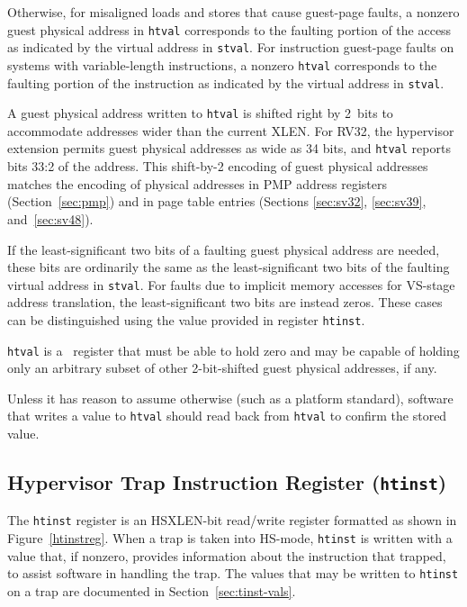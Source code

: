 Otherwise, for misaligned loads and stores that cause guest-page faults,
a nonzero guest physical address in {\tt htval} corresponds to the
faulting portion of the access as indicated by the virtual address in
{\tt stval}.
For instruction guest-page faults on systems with variable-length
instructions, a nonzero {\tt htval} corresponds to the faulting portion
of the instruction as indicated by the virtual address in {\tt stval}.

\begin{commentary}
A guest physical address written to {\tt htval} is shifted right by
2~bits to accommodate addresses wider than the current XLEN.
For RV32, the hypervisor extension permits guest physical addresses as
wide as 34 bits, and {\tt htval} reports bits 33:2 of the address.
This shift-by-2 encoding of guest physical addresses matches the encoding
of physical addresses in PMP address registers (Section~\ref{sec:pmp})
and in page table entries (Sections \ref{sec:sv32}, \ref{sec:sv39},
and~\ref{sec:sv48}).

If the least-significant two bits of a faulting guest physical address
are needed, these bits are ordinarily the same as the least-significant
two bits of the faulting virtual address in {\tt stval}.
For faults due to implicit memory accesses for VS-stage address
translation, the least-significant two bits are instead zeros.
These cases can be distinguished using the value provided in register
{\tt htinst}.
\end{commentary}

{\tt htval} is a \warl\ register that must be able to hold zero and may
be capable of holding only an arbitrary subset of other 2-bit-shifted
guest physical addresses, if any.

\begin{commentary}
Unless it has reason to assume otherwise (such as a platform standard),
software that writes a value to {\tt htval} should read back from
{\tt htval} to confirm the stored value.
\end{commentary}

\subsection{Hypervisor Trap Instruction Register ({\tt htinst})}

The {\tt htinst} register is an HSXLEN-bit read/write register formatted
as shown in Figure~\ref{htinstreg}.
When a trap is taken into HS-mode, {\tt htinst} is written with a value
that, if nonzero, provides information about the instruction that
trapped, to assist software in handling the trap.
The values that may be written to {\tt htinst} on a trap are documented
in Section~\ref{sec:tinst-vals}.

